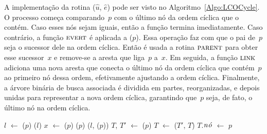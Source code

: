 A implementação da rotina \LCOCycle($\hat u$, $\hat e$) pode ser visto no Algoritmo~\ref{Algo:LCOCycle}.
O processo começa comparando~$p$ com o último nó da ordem cíclica que o contém.
Caso esses nós sejam iguais, então a função termina imediatamente.
Caso contrário, a função $\text{\scshape \text{\scshape evert}}$ é aplicada a \treapLast($p$).
Essa operação faz com que o pai de~$p$ seja o sucessor dele na ordem cíclica.
Então é usada a rotina $\text{\scshape \text{\scshape parent}}$ para obter esse sucessor~$x$ e remove-se a aresta que liga~$p$ a~$x$.
Em seguida, a função $\text{\scshape link}$ adiciona uma nova aresta que conecta o último nó da ordem cíclica que contém~$p$ ao primeiro nó dessa ordem, efetivamente ajustando a ordem cíclica.
Finalmente, a árvore binária de busca associada é dividida em partes, reorganizadas, e depois unidas para representar a nova ordem cíclica, garantindo que~$p$ seja, de fato, o último nó na ordem cíclica.


\begin{algorithm}[htb]
\caption{\LCOCycle($p$)}
\label{Algo:LCOCycle}
\begin{algorithmic}[1]
\State $l$ $\gets$ \treapLast($p$)
\State\Return
\EndIf
\State \linkcutEvert($l$)
\State $x$ $\gets$ \linkcutParent($p$)
\State \linkcutDelEdge($p$)
\State \linkcutAddEdge($l$, \treapFirst($p$))
\State $T$, $T'$ $\gets$ \treapSplitRight($p$)
\State $T$ $\gets$ \treapJoin($T'$, $T$)
\State $T$.$\mathit{n\acute{o}}$ $\gets$ $p$
\end{algorithmic}
\end{algorithm}
